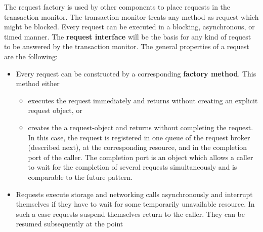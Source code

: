 \documentclass[a4paper, 10pt]{book}
\begin{document}
                                The request factory is used by other components to place requests in
                                the transaction monitor. The transaction monitor treats any method as
                                request which might be blocked. 
                                Every request can be executed in a blocking, asynchronous, or timed
                                manner. The \textbf{request interface} will be the basis for any
                                kind of request to be answered by the transaction monitor.
                                The general properties of a request are the following:
                                \begin{itemize}
                                    \item Every request can be constructed by a corresponding
                                        \textbf{factory method}. This method either
                                        \begin{itemize}
                                            \item executes the request immediately and returns without creating
                                                an explicit request object, or
                                            \item creates the a request-object and returns without completing
                                                the request. In this case, the request is registered in one queue
                                                of the request broker (described next), at the corresponding
                                                resource, and in the completion port of the caller. The completion
                                                port is an object which allows a caller to wait for the
                                                completion of several requests simultaneously and is comparable to
                                                the future pattern\cite{schmidt00}.
                                        \end{itemize}
                                    \item Requests execute storage and networking calls asynchronously and
                                        interrupt themselves if they have to wait for some temporarily
                                        unavailable resource. In such a case requests suspend themselves
                                        return to the caller. They can be resumed subsequently at the point

\end{itemize}
\end{document}
